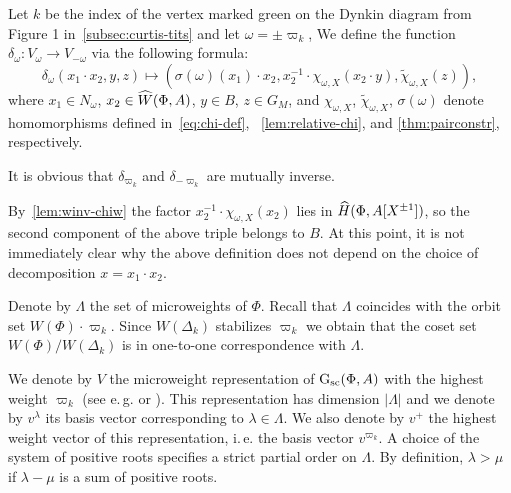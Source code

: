 \begin{dfn} \label{sigma-def}
  Let $k$ be the index of the vertex marked green on the Dynkin diagram from Figure 1 in~\cref{subsec:curtis-tits} and let $\omega = \pm \varpi_k$,
  We define the function $\delta_\omega \colon V_\omega \to V_{-\omega}$ via the following formula:
  \begin{equation} \label{eq:sigma-def} \delta_\omega(x_1 \cdot x_2, y, z) \mapsto (\sigma(\omega)(x_1)\cdot x_2, x_2^{-1} \cdot \chi_{\omega, X}(x_2 \cdot y), \widetilde{\chi}_{\omega, X}(z)), \end{equation}
  where $x_1 \in N_\omega$, $x_2 \in \widehat{W}(\Phi, A)$, $y \in B$, $z \in G_M$, and $\chi_{\omega, X}$, $\widetilde{\chi}_{\omega, X}$, $\sigma(\omega)$
  denote homomorphisms defined in~\eqref{eq:chi-def}, ~\cref{lem:relative-chi}, and \cref{thm:pairconstr}, respectively.
\end{dfn}
It is obvious that $\delta_{\varpi_k}$ and $\delta_{-\varpi_k}$ are mutually inverse.

By~\cref{lem:winv-chiw} the factor $x_2^{-1} \cdot \chi_{\omega, X}(x_2)$ lies in $\widehat{H}(\Phi, A[X^{\pm 1}])$,
 so the second component of the above triple belongs to $B$.
At this point, it is not immediately clear why the above definition does not depend on the choice of decomposition $x = x_1 \cdot x_2$.

Denote by $\Lambda$ the set of microweights of $\Phi$.
Recall that $\Lambda$ coincides with the orbit set $W(\Phi) \cdot \varpi_k$.
Since $W(\Delta_k)$ stabilizes $\varpi_k$ we obtain that the coset set $W(\Phi)/W(\Delta_k)$ is in one-to-one correspondence with $\Lambda$.

We denote by $V$ the microweight representation of $\operatorname{G}_\mathrm{sc}(\Phi, A)$ with the highest weight $\varpi_k$ (see e.\,g. \cite[\S~2]{Ge17} or \cite[\S~1.1]{V00}).
This representation has dimension $|\Lambda|$ and we denote by $v^\lambda$ its basis vector corresponding to $\lambda \in \Lambda$.
We also denote by $v^+$ the highest weight vector of this representation, i.\,e. the basis vector $v^{\varpi_k}$.
A choice of the system of positive roots specifies a strict partial order on $\Lambda$.
By definition, $\lambda > \mu$ if $\lambda - \mu$ is a sum of positive roots.

